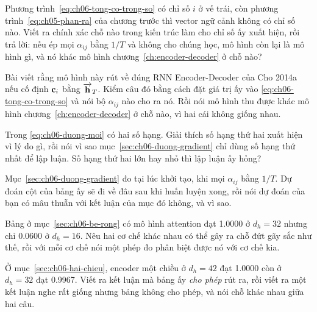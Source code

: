 \exercises

\tierunderstand

\begin{bt}
  \item Phương trình~\eqref{eq:ch06-tong-co-trong-so} có chỉ số \(i\) ở vế
    trái, còn phương trình~\eqref{eq:ch05-phan-ra} của chương trước thì vector
    ngữ cảnh không có chỉ số nào. Viết ra chính xác chỗ nào trong kiến trúc
    làm cho chỉ số ấy xuất hiện, rồi trả lời: nếu ép mọi \(\alpha_{ij}\) bằng
    \(1/T\) và không cho chúng học, mô hình còn lại là mô hình gì, và nó khác
    mô hình chương~\ref{ch:encoder-decoder} ở chỗ nào?

  \item Bài viết rằng mô hình này rút về đúng RNN Encoder-Decoder của Cho
    2014a nếu cố định \(\mathbf{c}_i\) bằng \(\overrightarrow{\mathbf{h}}_{T}\).
    Kiểm câu đó bằng cách đặt giá trị ấy vào
    \eqref{eq:ch06-tong-co-trong-so} và nói bộ \(\alpha_{ij}\) nào cho ra nó.
    Rồi nói mô hình thu được khác mô hình chương~\ref{ch:encoder-decoder} ở
    chỗ nào, vì hai cái không giống nhau.

  \item Trong \eqref{eq:ch06-duong-moi} có hai số hạng. Giải thích số hạng thứ
    hai xuất hiện vì lý do gì, rồi nói vì sao mục~\ref{sec:ch06-duong-gradient}
    chỉ dùng số hạng thứ nhất để lập luận. Số hạng thứ hai lớn hay nhỏ thì lập
    luận ấy hỏng?

  \item Mục~\ref{sec:ch06-duong-gradient} đo tại lúc khởi tạo, khi mọi
    \(\alpha_{ij}\) bằng \(1/T\). Dự đoán cột  của
    bảng ấy sẽ đi về đâu sau khi huấn luyện xong, rồi nói dự đoán của bạn có
    mâu thuẫn với kết luận của mục đó không, và vì sao.

  \item Bảng ở mục~\ref{sec:ch06-be-rong} có mô hình attention đạt 1.0000 ở
    \(d_h = 32\) nhưng chỉ 0.0600 ở \(d_h = 16\). Nêu hai cơ chế khác nhau có
    thể gây ra chỗ đứt gãy sắc như thế, rồi với mỗi cơ chế nói một phép đo
    phân biệt được nó với cơ chế kia.

  \item Ở mục~\ref{sec:ch06-hai-chieu}, encoder một chiều ở \(d_h = 42\) đạt
    1.0000 còn  ở \(d_h = 32\)
    đạt 0.9967. Viết ra kết luận
    mà bảng ấy \emph{cho phép} rút ra, rồi viết ra một kết luận nghe rất giống
    nhưng bảng không cho phép, và nói chỗ khác nhau giữa hai câu.


\end{bt}

